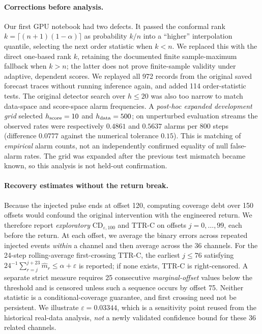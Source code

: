 \documentclass[10pt]{article}
\begin{document}
\paragraph{Corrections before analysis.}
Our first GPU notebook had two defects. It passed the conformal rank
$k=\lceil(n+1)(1-\alpha)\rceil$ as probability $k/n$ into a
``higher'' interpolation quantile, selecting the next order statistic
when $k<n$. We replaced this with the direct one-based rank $k$,
retaining the documented finite sample-maximum fallback when $k>n$;
the latter does not prove finite-sample validity under adaptive,
dependent scores. We replayed all 972 records from the original
saved forecast traces without running inference again, and added
114 order-statistic tests. The original detector search over
$h\leq20$ was also too narrow to match data-space and score-space
alarm frequencies. A \emph{post-hoc expanded development grid}
selected $h_{\rm score}=10$ and $h_{\rm data}=500$; on unperturbed
evaluation streams the observed rates were respectively $0.4861$ and
$0.5637$ alarms per 800 steps (difference $0.0777$ against the
numerical tolerance $0.15$). This is matching of \emph{empirical}
alarm counts, not an independently confirmed equality of null false-alarm
rates. The grid was expanded after the previous test mismatch became
known, so this analysis is not held-out confirmation.

\paragraph{Recovery estimates without the return break.}
Because the injected pulse ends at offset 120, computing coverage debt
over 150 offsets would confound the original intervention with the
engineered return. We therefore report \emph{exploratory} $\mathrm{CD}_{\varepsilon,100}$
and TTR-C on offsets $j=0,\ldots,99$, each before the return. At each
offset, we average the binary errors across repeated injected events
\emph{within} a channel and then average across the 36 channels.
For the 24-step rolling-average first-crossing TTR-C, the earliest
$j\leq76$ satisfying $24^{-1}\sum_{r=j}^{j+23}\widehat m_r
\leq\alpha+\varepsilon$ is reported; if none exists, TTR-C is
right-censored. A separate strict measure requires 25 consecutive
\emph{marginal-offset} values below the threshold and is censored
unless such a sequence occurs by offset 75. Neither statistic is a
conditional-coverage guarantee, and first crossing need not be persistent.
We illustrate $\varepsilon=0.03344$, which is a sensitivity point
reused from the historical real-data analysis, \emph{not} a newly
validated confidence bound for these 36 related channels.
\end{document}

